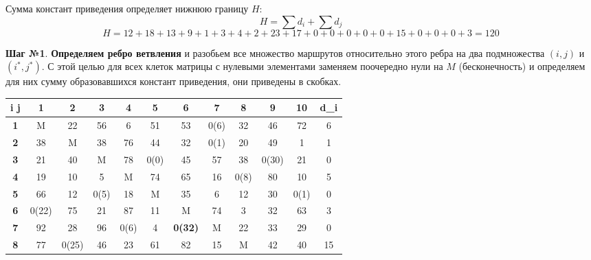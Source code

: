 \documentclass[17pt]{extarticle}
\begin{document}
Сумма констант приведения определяет нижнюю границу \( H \):
\[ H = \sum d_i + \sum d_j \]
\[ H = 12 + 18 + 13 + 9 + 1 + 3 + 4 + 2 + 23 + 17 + 0 + 0 + 0 + 0 + 0 + 15 + 0 + 0 + 0 + 3 = 120 \]

\textbf{Шаг №1}.
\textbf{Определяем ребро ветвления} и разобьем все множество маршрутов относительно этого ребра на два подмножества \( (i,j) \) и \( (i^*,j^*) \).
С этой целью для всех клеток матрицы с нулевыми элементами заменяем поочередно нули на \( M \) (бесконечность) и определяем для них сумму образовавшихся констант приведения, они приведены в скобках.

\begin{table}[H]
    \centering
    \begin{tabular}{|c|c|c|c|c|c|c|c|c|c|c|c|}
        \hline
        \textbf{i j} & \textbf{1} & \textbf{2} & \textbf{3} & \textbf{4} & \textbf{5} & \textbf{6}     & \textbf{7} & \textbf{8} & \textbf{9} & \textbf{10} & \textbf{d}_i \\ \hline
        \textbf{1}   & M          & 22         & 56         & 6          & 51         & 53             & 0(6)       & 32         & 46         & 72          & 6            \\ \hline
        \textbf{2}   & 38         & M          & 38         & 76         & 44         & 32             & 0(1)       & 20         & 49         & 1           & 1            \\ \hline
        \textbf{3}   & 21         & 40         & M          & 78         & 0(0)       & 45             & 57         & 38         & 0(30)      & 21          & 0            \\ \hline
        \textbf{4}   & 19         & 10         & 5          & M          & 74         & 65             & 16         & 0(8)       & 80         & 10          & 5            \\ \hline
        \textbf{5}   & 66         & 12         & 0(5)       & 18         & M          & 35             & 6          & 12         & 30         & 0(1)        & 0            \\ \hline
        \textbf{6}   & 0(22)      & 75         & 21         & 87         & 11         & M              & 74         & 3          & 32         & 63          & 3            \\ \hline
        \textbf{7}   & 92         & 28         & 96         & 0(6)       & 4          & \textbf{0(32)} & M          & 22         & 33         & 29          & 0            \\ \hline
        \textbf{8}   & 77         & 0(25)      & 46         & 23         & 61         & 82             & 15         & M          & 42         & 40          & 15           \\ \hline

\end{tabular}
\end{table}
\end{document}
